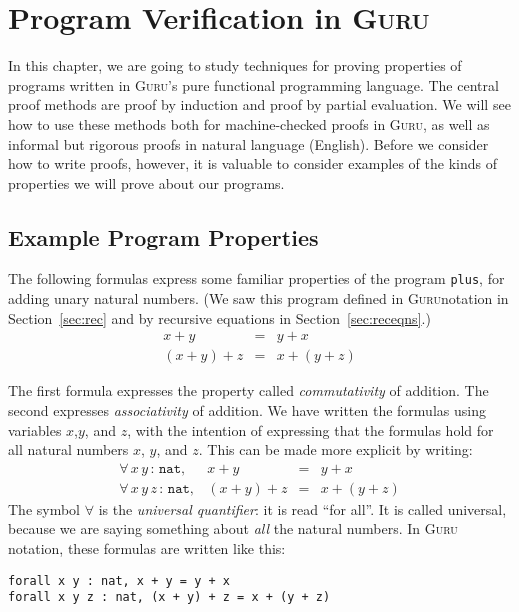 \documentclass{book}[12pt]
\newcommand{\guru}[0]{\textsc{Guru}}
\begin{document}
\chapter{Program Verification in \guru}

In this chapter, we are going to study techniques for proving
properties of programs written in \guru's pure functional programming
language.  The central proof methods are proof by induction and proof
by partial evaluation.  We will see how to use these methods both for
machine-checked proofs in \guru, as well as informal but rigorous proofs
in natural language (English).  Before we consider how to write
proofs, however, it is valuable to consider examples of the kinds of
properties we will prove about our programs.

\section{Example Program Properties}

The following formulas express some familiar properties of the program
\texttt{plus}, for adding unary natural numbers.  (We saw this program
defined in \guru notation in Section~\ref{sec:rec} and by recursive equations
in Section~\ref{sec:receqns}.)
\[ 
\begin{array}{lll}
x+y & = & y + x \\
(x+y)+z & = & x+(y+z)
\end{array}
\]

\noindent The first formula expresses the property called
\emph{commutativity} of addition.  The second expresses
\emph{associativity} of addition.  We have written the formulas
using variables $x$,$y$, and $z$, with the intention of expressing
that the formulas hold for all natural numbers $x$, $y$, and $z$.
This can be made more explicit by writing:
\[ 
\begin{array}{llll}
\forall\, x\,y\,:\,\texttt{nat},& x+y & = & y + x \\
\forall\, x\,y\,z\,:\,\texttt{nat}, & (x+y)+z & = & x+(y+z)
\end{array}
\]
\noindent The symbol $\forall$ is the \emph{universal quantifier}:
it is read ``for all''.  It is called universal, because we are
saying something about \emph{all} the natural numbers.  In \guru
notation, these formulas are written like this:

\begin{verbatim}
forall x y : nat, x + y = y + x 
forall x y z : nat, (x + y) + z = x + (y + z)
\end{verbatim}
\end{document}
